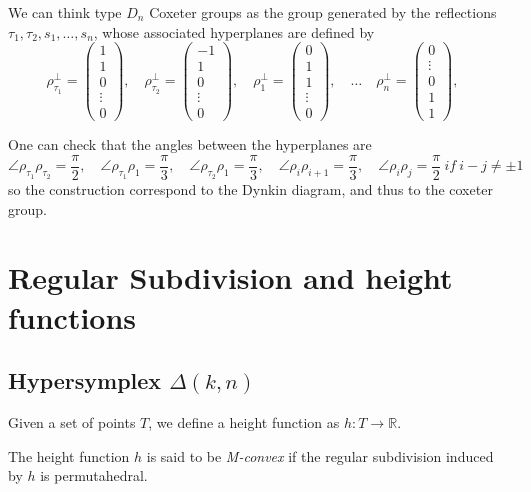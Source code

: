 \documentclass{myclass}
\begin{document}
We can think type $D_n$ Coxeter groups as the group generated by the reflections  $\tau_1, \tau_2, s_1, \ldots, s_n$, whose associated hyperplanes are defined by
\[
\rho_{\tau_1} ^\perp = \begin{pmatrix} 1 \\ 1 \\ 0 \\  \vdots \\ 0 \end{pmatrix} , \quad 
\rho_{\tau_2} ^\perp = \begin{pmatrix} -1 \\ 1 \\ 0\\ \vdots \\ 0 \end{pmatrix} , \quad 
\rho_1 ^\perp = \begin{pmatrix} 0 \\ 1 \\ 1\\ \vdots \\ 0 \end{pmatrix} , \quad \ldots \quad
\rho_n ^\perp = \begin{pmatrix} 0 \\ \vdots \\ 0 \\ 1\\ 1 \end{pmatrix} , \quad 
\] 

One can check that the angles between the hyperplanes are
\[
\angle \rho_{\tau_1} \rho _{\tau _2} = \frac{\pi}{2}, \quad
\angle \rho_{\tau_1} \rho _{1} = \frac{\pi}{3}, \quad
\angle \rho_{\tau_2} \rho _{1} = \frac{\pi}{3}, \quad
\angle \rho_i \rho _{i+1} = \frac{\pi}{3}, \quad 
\angle \rho_i \rho _{j} = \frac{\pi}{2}\ if\ i-j\neq \pm 1 \quad 
\] 
so the construction correspond to the Dynkin diagram, and thus to the coxeter group.


\section{Regular Subdivision and height functions}
\subsection{Hypersymplex $\Delta(k, n)$}
Given a set of points $T$, we define a height function as  $h:T \to \mathbb{R}$.

The height function $h$ is said to be \textit{M-convex} if the regular subdivision induced by $h$ is permutahedral.
\end{document}
